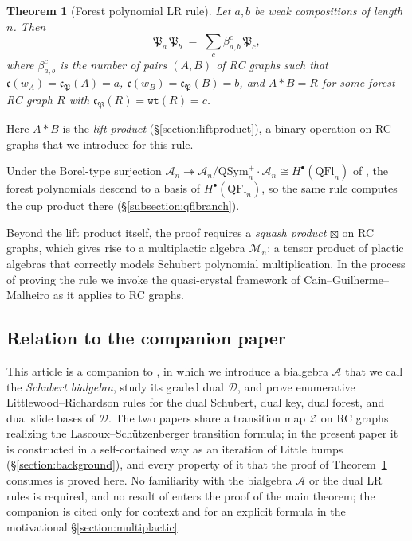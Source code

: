 \documentclass{amsart}
\newtheorem{theorem}{Theorem}[section]
\theoremstyle{definition}
\theoremstyle{remark}
\numberwithin{equation}{subsection}
\newcommand{\wof}[1]{w_{#1}}
\newcommand{\wtt}{\mathtt{wt}}
\newcommand{\zeromap}{\mathcal{Z}}
\newcommand{\coma}{\mathcal{A}}
\newcommand{\dcoma}{\mathcal{D}}
\newcommand{\code}{\mathfrak{c}}
\newcommand{\forest}{\mathfrak{P}}
\begin{document}
\begin{theorem}[Forest polynomial LR rule]\label{theorem:forestpolyLR}
Let $a,b$ be weak compositions of length $n$. Then
$$\forest_a\,\forest_b \;=\; \sum_c \beta_{a,b}^c\,\forest_c,$$
where $\beta_{a,b}^c$ is the number of pairs $(A,B)$ of RC graphs such that $\code(\wof{A}) = \code_\forest(A) = a$, $\code(\wof{B}) = \code_\forest(B) = b$, and $A*B = R$ for some forest RC graph $R$ with $\code_\forest(R) = \wtt(R) = c$.
\end{theorem}
Here $A*B$ is the \emph{lift product} (\S\ref{section:liftproduct}), a binary operation on RC graphs that we introduce for this rule.

Under the Borel-type surjection $\coma_n\twoheadrightarrow \coma_n/\mathrm{QSym}_n^+\cdot\coma_n\cong H^\bullet(\mathrm{QFl}_n)$ of \cite{bergeron2025qsymflag}, the forest polynomials descend to a basis of $H^\bullet(\mathrm{QFl}_n)$, so the same rule computes the cup product there (\S\ref{subsection:qflbranch}).

Beyond the lift product itself, the proof requires a \emph{squash product} $\boxtimes$ on RC graphs, which gives rise to a multiplactic algebra $\mathcal{M}_n$: a tensor product of plactic algebras that correctly models Schubert polynomial multiplication. In the process of proving the rule we invoke the quasi-crystal framework of Cain--Guilherme--Malheiro \cite{cain2023quasicrystals} as it applies to RC graphs.

\subsection*{Relation to the companion paper}

This article is a companion to \cite{companionbialgebra}, in which we introduce a bialgebra $\coma$ that we call the \emph{Schubert bialgebra}, study its graded dual $\dcoma$, and prove enumerative Littlewood--Richardson rules for the dual Schubert, dual key, dual forest, and dual slide bases of $\dcoma$. The two papers share a transition map $\zeromap$ on RC graphs realizing the Lascoux--Sch\"utzenberger transition formula; in the present paper it is constructed in a self-contained way as an iteration of Little bumps (\S\ref{section:background}), and every property of it that the proof of Theorem~\ref{theorem:forestpolyLR} consumes is proved here. No familiarity with the bialgebra $\coma$ or the dual LR rules is required, and no result of \cite{companionbialgebra} enters the proof of the main theorem; the companion is cited only for context and for an explicit formula in the motivational \S\ref{section:multiplactic}.
\end{document}
